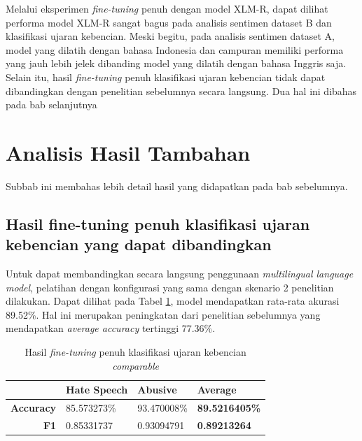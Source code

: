         Melalui eksperimen \textit{fine-tuning} penuh dengan model XLM-R, dapat dilihat performa model XLM-R sangat bagus pada analisis sentimen dataset B dan klasifikasi ujaran kebencian. Meski begitu, pada analisis sentimen dataset A, model yang dilatih dengan bahasa Indonesia dan campuran memiliki performa yang jauh lebih jelek dibanding model yang dilatih dengan bahasa Inggris saja. Selain itu, hasil \textit{fine-tuning} penuh klasifikasi ujaran kebencian tidak dapat dibandingkan dengan penelitian sebelumnya secara langsung. Dua hal ini dibahas pada bab selanjutnya

\section{Analisis Hasil Tambahan}
    Subbab ini membahas lebih detail hasil yang didapatkan pada bab sebelumnya.
    
    \subsection{Hasil fine-tuning penuh klasifikasi ujaran kebencian yang dapat dibandingkan}
        Untuk dapat membandingkan secara langsung penggunaan \textit{multilingual language model}, pelatihan dengan konfigurasi yang sama dengan skenario 2 penelitian \parencite{Ibrohim_Budi_2019} dilakukan. Dapat dilihat pada Tabel \ref{tab:toxic_xlm_r_comparable}, model mendapatkan rata-rata akurasi 89.52\%. Hal ini merupakan peningkatan dari penelitian sebelumnya yang mendapatkan \textit{average accuracy} tertinggi 77.36\%.

        \begin{table}[!h]
            \centering
            \caption{Hasil \textit{fine-tuning} penuh klasifikasi ujaran kebencian \textit{comparable}}
            \begin{tabular}{|r|l|l|l|}
            \hline
            \multicolumn{1}{|l|}{} & \textbf{Hate Speech} & \textbf{Abusive} & \textbf{Average}      \\ \hline
            \textbf{Accuracy}      & 85.573273\%          & 93.470008\%      & \textbf{89.5216405\%} \\ \hline
            \textbf{F1}            & 0.85331737           & 0.93094791       & \textbf{0.89213264}   \\ \hline
            \end{tabular}
            
            \label{tab:toxic_xlm_r_comparable}
        \end{table}

